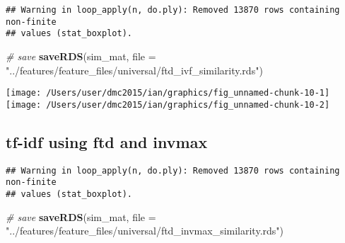 \documentclass[10pt]{report}
\newenvironment{Shaded}{}{}
\newcommand{\KeywordTok}[1]{\textcolor[rgb]{0.00,0.44,0.13}{\textbf{{#1}}}}
\newcommand{\DataTypeTok}[1]{\textcolor[rgb]{0.56,0.13,0.00}{{#1}}}
\newcommand{\StringTok}[1]{\textcolor[rgb]{0.25,0.44,0.63}{{#1}}}
\newcommand{\CommentTok}[1]{\textcolor[rgb]{0.38,0.63,0.69}{\textit{{#1}}}}
\newcommand{\NormalTok}[1]{{#1}}
\begin{document}
\begin{verbatim}
## Warning in loop_apply(n, do.ply): Removed 13870 rows containing non-finite
## values (stat_boxplot).
\end{verbatim}

\begin{Shaded}
\begin{Highlighting}[]
\CommentTok{# save}
\KeywordTok{saveRDS}\NormalTok{(sim_mat, }\DataTypeTok{file =} \StringTok{"../features/feature_files/universal/ftd_ivf_similarity.rds"}\NormalTok{)}
\end{Highlighting}
\end{Shaded}

\begin{center}\texttt{[image: /Users/user/dmc2015/ian/graphics/fig\_unnamed-chunk-10-1]} \texttt{[image: /Users/user/dmc2015/ian/graphics/fig\_unnamed-chunk-10-2]} \end{center}

\subsection{tf-idf using ftd and
invmax}\label{tf-idf-using-ftd-and-invmax}

\begin{Shaded}
\end{Shaded}

\begin{verbatim}
## Warning in loop_apply(n, do.ply): Removed 13870 rows containing non-finite
## values (stat_boxplot).
\end{verbatim}

\begin{Shaded}
\begin{Highlighting}[]
\CommentTok{# save}
\KeywordTok{saveRDS}\NormalTok{(sim_mat, }\DataTypeTok{file =} \StringTok{"../features/feature_files/universal/ftd_invmax_similarity.rds"}\NormalTok{)}
\end{Highlighting}
\end{Shaded}
\end{document}
